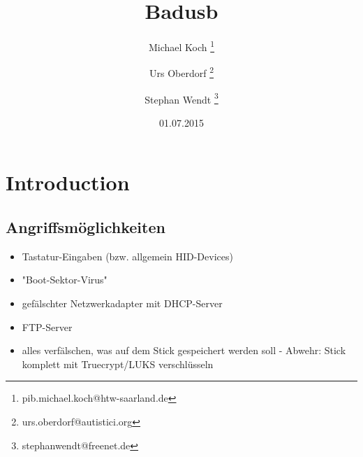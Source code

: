 \documentclass[
a4paper, %
twoside%
]{article}
\title{Badusb}
\author{Michael Koch
\thanks{pib.michael.koch@htw-saarland.de}
\and{Urs Oberdorf}
\thanks{urs.oberdorf@autistici.org}
\and{Stephan Wendt}
\thanks{stephanwendt@freenet.de}}
\date{01.07.2015}
\begin{document}

\maketitle





\section{Introduction}
\subsection{Angriffsmöglichkeiten}
\begin{itemize}
\item Tastatur-Eingaben (bzw. allgemein HID-Devices)
\item "Boot-Sektor-Virus"
\item gefälschter Netzwerkadapter mit DHCP-Server
\item FTP-Server
\item alles verfälschen, was auf dem Stick gespeichert werden soll - Abwehr: Stick komplett mit Truecrypt/LUKS verschlüsseln
\end{itemize}
\end{document}
